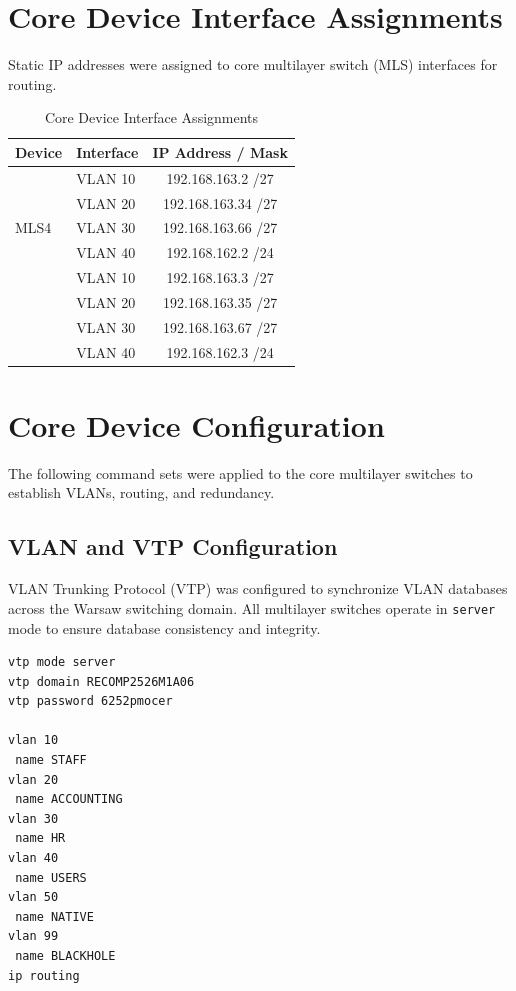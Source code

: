 \section{Core Device Interface Assignments}

Static IP addresses were assigned to core multilayer switch (MLS) interfaces for routing.
\begin{table}[h!]
\centering
\caption{Core Device Interface Assignments}
\begin{tabular}{|l|l|c|}
\hline
\textbf{Device} & \textbf{Interface} & \textbf{IP Address / Mask} \\

\hline
\multirow{5}{*}{MLS4} 
                      & VLAN 10 & 192.168.163.2 /27 \\
                      & VLAN 20 & 192.168.163.34 /27 \\
                      & VLAN 30 & 192.168.163.66 /27 \\
                      & VLAN 40 & 192.168.162.2 /24 \\
\hline
\multirow{5}{*}{MLS5} 
                      & VLAN 10 & 192.168.163.3 /27 \\
                      & VLAN 20 & 192.168.163.35 /27 \\
                      & VLAN 30 & 192.168.163.67 /27 \\
                      & VLAN 40 & 192.168.162.3 /24 \\
\hline
\end{tabular}
\label{tab:warsaw-core}
\end{table}


\section{Core Device Configuration}

The following command sets were applied to the core multilayer switches to establish VLANs, routing, and redundancy.

\subsection{VLAN and VTP Configuration}

VLAN Trunking Protocol (VTP) was configured to synchronize VLAN databases across the Warsaw switching domain.  
All multilayer switches operate in \texttt{server} mode to ensure database consistency and integrity.

\begin{lstlisting}[caption={VLAN and VTP configuration}, label={lst:warsaw-vtp}]
vtp mode server
vtp domain RECOMP2526M1A06
vtp password 6252pmocer

vlan 10
 name STAFF
vlan 20
 name ACCOUNTING
vlan 30
 name HR
vlan 40
 name USERS
vlan 50
 name NATIVE
vlan 99
 name BLACKHOLE
ip routing
\end{lstlisting}

